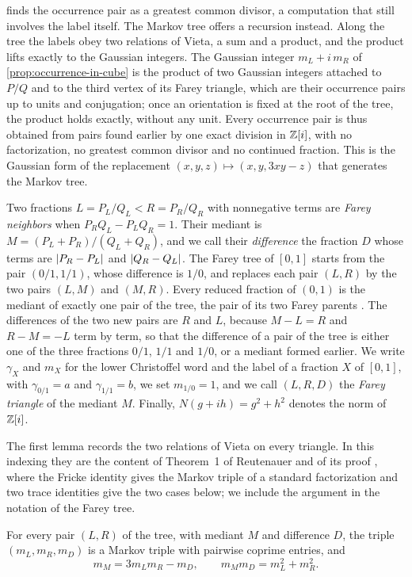  finds the occurrence pair as a greatest
common divisor, a computation that still involves the label itself. The
Markov tree offers a recursion instead. Along the tree the labels obey two
relations of Vieta, a sum and a product, and the product lifts exactly to
the Gaussian integers. The Gaussian integer $m_L+i\,m_R$ of
\cref{prop:occurrence-in-cube} is the product of two Gaussian integers
attached to $P/Q$ and to the third vertex of its Farey triangle, which are
their occurrence pairs up to units and conjugation; once an orientation is
fixed at the root of the tree, the product holds exactly, without any unit.
Every occurrence pair is thus obtained from pairs found earlier by one exact
division in $\mathbb{Z}[i]$, with no factorization, no greatest common divisor and
no continued fraction. This is the Gaussian form of the replacement
$(x,y,z)\mapsto(x,y,3xy-z)$ that generates the Markov tree.

Two fractions $L=P_L/Q_L<R=P_R/Q_R$ with nonnegative terms are \emph{Farey
neighbors} when $P_RQ_L-P_LQ_R=1$. Their mediant is
$M=(P_L+P_R)/(Q_L+Q_R)$, and we call their \emph{difference} the fraction $D$
whose terms are $\lvert P_R-P_L\rvert$ and $\lvert Q_R-Q_L\rvert$. The Farey tree of $[0,1]$
starts from the pair $(0/1,1/1)$, whose difference is $1/0$, and replaces
each pair $(L,R)$ by the two pairs $(L,M)$ and $(M,R)$. Every reduced
fraction of $(0,1)$ is the mediant of exactly one pair of the tree, the pair
of its two Farey parents \cite[Section~3.2, Theorem~3.9 and its proof]{Aigner2013}.
The differences of the two new pairs are $R$ and $L$, because $M-L=R$ and
$R-M=-L$ term by term, so that the difference of a pair of the tree is
either one of the three fractions $0/1$, $1/1$ and $1/0$, or a mediant
formed earlier. We write $\gamma_X$ and $m_X$ for the lower Christoffel word
and the label of a fraction $X$ of $[0,1]$, with $\gamma_{0/1}=a$ and
$\gamma_{1/1}=b$, we set $m_{1/0}=1$, and we call $(L,R,D)$ the \emph{Farey
triangle} of the mediant $M$. Finally, $N(g+ih)=g^2+h^2$ denotes the norm of
$\mathbb{Z}[i]$.

The first lemma records the two relations of Vieta on every triangle. In
this indexing they are the content of Theorem~1 of Reutenauer and of its
proof \cite[Theorem~1 and its proof]{Reutenauer2009}, where the Fricke
identity gives the Markov triple of a standard factorization and two trace
identities give the two cases below; we include the argument in the
notation of the Farey tree.

\begin{lemma}\label{lem:farey-triangle}
For every pair $(L,R)$ of the tree, with mediant $M$ and difference $D$, the
triple $(m_L,m_R,m_D)$ is a Markov triple with pairwise coprime entries, and
\begin{equation}\label{eq:vieta-relations}
 m_M=3m_Lm_R-m_D,\qquad m_Mm_D=m_L^2+m_R^2 .
\end{equation}
\end{lemma}

